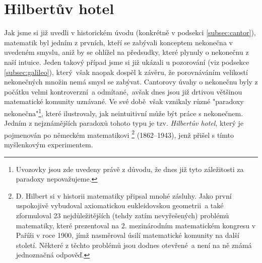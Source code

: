 \section{Hilbertův hotel}\label{sec:hilbertuv_hotel}
Jak jsme si již uvedli v historickém úvodu (konkrétně v podsekci \ref{subsec:cantor}), matematik  byl jedním z prvních, kteří se zabývali konceptem nekonečna v uvedeném smyslu, aniž by se ohlížel na předsudky, které plynuly o nekonečnu z naší intuice. Jeden takový případ jsme si již ukázali u pozorování  (viz podsekce \ref{subsec:galileo}), který~však naopak dospěl k závěru, že porovnáváním velikostí nekonečných množin nemá smysl se zabývat. Cantorovy úvahy o nekonečnu byly z počátku velmi kontroverzní~a odmítané,~avšak dnes jsou již drtivou většinou matematické komunity uznávané. Ve své době~však vznikaly různé "paradoxy nekonečna"\footnote{Uvozovky jsou zde uvedeny právě z důvodu, že dnes již tyto záležitosti za paradoxy nepovažujeme.}, které ilustrovaly, jak neintuitivní může být práce s nekonečnem. Jedním z nejznámějších paradoxů tohoto typu je tzv. \emph{Hilbertův hotel}, který je pojmenován po německém matematikovi \footnote{D. Hilbert si v historii matematiky připsal mnohé zásluhy. Jako první uspokojivě vybudoval axiomatickou eukleidovskou geometrii~a také zformuloval 23 nejdůležitějších (tehdy zatím nevyřešených) problémů matematiky, které prezentoval na 2. mezinárodním matematickém kongresu v Paříži v roce 1900, jímž nasměroval úsilí matematické komunity na další století. Některé z těchto problémů jsou dodnes otevřené~a není na ně známá jednoznačná odpověď.} (1862--1943), jenž přišel s tímto myšlenkovým experimentem.
\medskip


